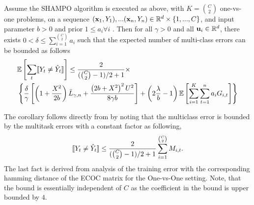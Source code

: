 \begin{corollary}
Assume the SHAMPO algorithm is executed as above, with $K={C \choose 2}$ one-vs-one problems, 
on a sequence $(\mathbf{x}_1,Y_1),...(\mathbf{x}_n,Y_n)\in\mathbb{R}^d\times\{1,...,C\}$, and input parameter 
$b>0$ and prior $1\le a_i\forall i$ . Then for all $\gamma>0$ and all $\mathbf{u}_{i}\in\mathbb{R}^d$, 
there exists $0<\delta\le \sum_{i=1}^{C \choose 2}a_{i}$ such that the expected number of multi-class 
errors can be bounded as follows
 \[
 \begin{split}
 &\mathbb{E}\left[{\sum_t [\![{Y_t \neq \hat{Y}_t}]\!]}\right]\le \frac{2}{({C \choose 2}-1)/2+1}\times\\
 &\left\{{ \frac{\delta}{\gamma}\left[{\left({1+\frac{X^2}{2b} }\right){\bar L}_{\gamma,n}+\frac{\left({{2b+X^2}}\right)^2U^{2}}{8{\gamma}b}}\right]+\left({2\frac{\lambda}{b}-1}\right)\mathbb{E}\left[{\sum_{i=1}^{K}\sum_{t=1}^{n}{a_{i}G_{i,t}}}\right]}\right\}
 \end{split}
 \]

\end{corollary}
The corollary follows directly from  by noting that the  multiclass error 
is bounded by the multitask errors with a constant factor as following, 
\[
[\![{Y_t \neq \hat{Y}_t}]\!] \leq \frac{2}{({C \choose 2}-1)/2+1}\sum_{i=1}^{ {C \choose 2}} M_{i,t}. 
\]
The last fact is derived from \cite{allwein2001reducing} analysis of the training error 
with the corresponding hamming distance of the ECOC matrix for the One-vs-One 
setting. Note, that the bound is essentially  independent of $C$ as the coefficient in the bound is upper 
bounded by $4$.


